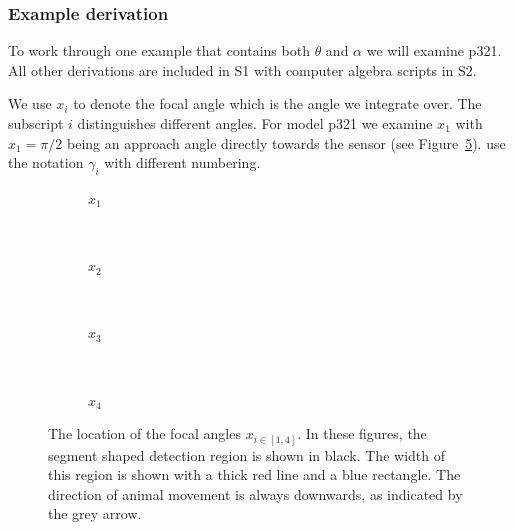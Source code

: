 \documentclass[a4paper,10pt,reqno,oneside]{amsart}
\begin{document}
\subsubsection{Example derivation}

To work through one example that contains both $\theta$ and $\alpha$ we will examine p321. All other derivations are included in S1 with computer algebra scripts in S2. 

We use $x_i$ to denote the focal angle which is the angle we integrate over. The subscript $i$ distinguishes different angles. For model p321 we examine $x_1$ with  $x_1 = \pi/2$ being an approach angle directly towards the sensor (see Figure~\ref{f:xis}). \cite{rowcliffe2008estimating} use the notation $\gamma_i$ with different numbering.

\begin{figure}[t]
        \centering
        \begin{subfigure}[t]{0.34\textwidth}
                \centering
                \caption{$x_1$}
                \label{f:tikz1}
        \end{subfigure}
        ~ 
        \begin{subfigure}[t]{0.22\textwidth}
                \centering
                \caption{$x_2$}
                \label{f:x2}
        \end{subfigure}
        ~ 
	\begin{subfigure}[t]{0.22\textwidth}
                \centering
                \caption{$x_3$}
                \label{f:x3}
        \end{subfigure}%
	~
	\begin{subfigure}[t]{0.22\textwidth}
                \centering
                \caption{$x_4$}
                \label{f:x4}
        \end{subfigure}%
\caption{The location of the focal angles $x_{i\in[1,4]}$. In these figures, the segment shaped detection region is shown in black. The width of this region is shown with a thick red line and a blue rectangle. The direction of animal movement is always downwards, as indicated by the grey arrow.}
\label{f:xis}
\end{figure}
\end{document}
